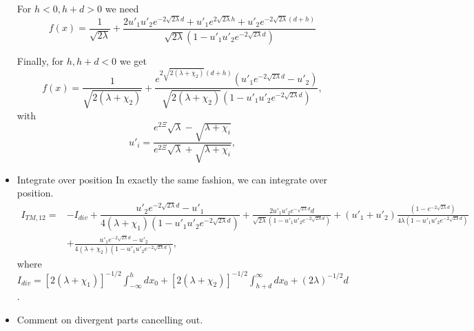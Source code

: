 \begin{itemize}
    For $h<0, h+d>0$ we need 
    \begin{equation}
      f(x) = \frac{1}{\sqrt{2\lambda}} + \frac{2u'_1u'_2 e^{-2\sqrt{2\lambda}d} + u'_1 e^{2\sqrt{2\lambda}h} +u'_2 e^{-2\sqrt{2\lambda}(d+h)}}{\sqrt{2\lambda}(1-u'_1u'_2 e^{-2\sqrt{2\lambda}d})}
    \end{equation}

    Finally, for $h,h+d<0$ we get 
    \begin{equation}
      f(x) =  \frac{1}{\sqrt{2(\lambda+\chi_2)}} + \frac{e^{2\sqrt{2(\lambda+\chi_2)}(d+h)}(u'_1 e^{-2\sqrt{2\lambda}d} - u'_2)}{\sqrt{2(\lambda+\chi_2)}(1-u'_1u'_2 e^{-2\sqrt{2\lambda}d})},
    \end{equation}
    with 
    \begin{equation}
      u'_i = \frac{e^{2\Xi}\sqrt{\lambda} -\sqrt{\lambda+\chi_i}}{e^{2\Xi}\sqrt{\lambda} + \sqrt{\lambda+\chi_i}},
    \end{equation}
  \item {Integrate over position}
    In exactly the same fashion, we can integrate over position.  
    \begin{align}
      I_{TM,12} =& -I_{div} + \dfrac{u'_2 e^{-2\sqrt{2\lambda}d}-u'_1}{4(\lambda+\chi_1)(1-u'_1u'_2 e^{-2\sqrt{2\lambda}d})} +\frac{2u'_1u'_2 e^{-\sqrt{2\lambda}d}d}{\sqrt{2\lambda}(1-u'_1u'_2 e^{-2\sqrt{2\lambda}d})} + (u'_1+u'_2)\frac{(1-e^{-2\sqrt{2\lambda}d})}{4\lambda(1-u'_1u'_2e^{-2\sqrt{2\lambda}d})}\nonumber\\
      & +\frac{u'_1 e^{-2\sqrt{2\lambda}d} - u'_2}{4(\lambda+\chi_2)(1-u'_1u'_2 e^{-2\sqrt{2\lambda}d})},
    \end{align}
    where $I_{div} = [2(\lambda+\chi_1)]^{-1/2}\int_{-\infty}^h dx_0  +  [2(\lambda+\chi_2)]^{-1/2}\int_{h+d}^\infty dx_0  + (2\lambda)^{-1/2}d$.
  \item Comment on divergent parts cancelling out. 
\end{itemize}



